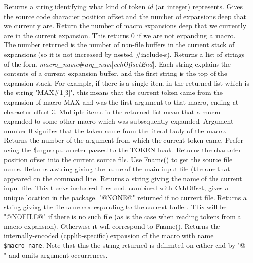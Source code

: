Returns a string identifying what kind of token \textit{id} (an integer) represents.
Gives the source code character position offset and the number of expansions
deep that we currently are.
Return the number of macro expansions deep that we currently are in
the current expansion.  This returns 0 if we are not expanding a macro.
The number returned is the number of non-file buffers in the current
stack of expansions (so it is not increased by nested \#include-s).
Returns a list of strings of the form 
\textit{macro\_\-name}\#\textit{arg\_\-num}[\textit{cchOffsetEnd}]. 
Each string explains the contents of a current expansion buffer,
and the first string is the top of the expansion stack.
For example, if there is a single item in the returned list
which is the string "MAX\#1[3]", this means that the current
token came from the expansion of macro MAX and was the first argument
to that macro, ending at character offset 3.  Multiple items
in the returned list mean that a macro expanded to some other
macro which was subsequently expanded.  Argument number 0 signifies
that the token came from the literal body of the macro.
Returns the number of the argument from which the current token came.
Prefer using the \$argno parameter passed to the TOKEN hook.
Returns the character position offset into the current source file.
Use Fname() to get the source file name.
Returns a string giving the name of the main input file (the one
that appeared on the command line.
Returns a string giving the name of the current input file.  This
tracks include-d files and, combined with CchOffset, gives a
unique location in the package.  "@NONE@" returned if no current file.
Returns a string giving the filename corresponding to the current
buffer.  This will be "@NOFILE@" if there is no such file (as is
the case when reading tokens from a macro expansion).
Otherwise it will correspond to Fname().
Returns the internally-encoded (cpplib-specific) expansion of
the macro with name \texttt{\$macro\_\-name}.  Note that this the string
returned is delimited on either end by "@ " and omits argument occurrences.
